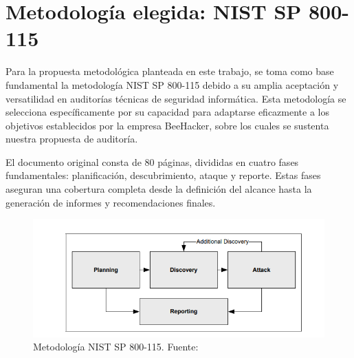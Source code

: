 \documentclass[a4paper, 11pt]{article}
\begin{document}
\par\vspace{0.5cm}




\clearpage







\section{Metodología elegida: NIST SP 800-115}

\par\vspace{0.5cm}

Para la propuesta metodológica planteada en este trabajo, se toma como base fundamental la metodología NIST SP 800-115 debido a su amplia aceptación y versatilidad en auditorías técnicas de seguridad informática. Esta metodología se selecciona específicamente por su capacidad para adaptarse eficazmente a los objetivos establecidos por la empresa BeeHacker, sobre los cuales se sustenta nuestra propuesta de auditoría. 
\par\vspace{0.5cm}


El documento original consta de 80 páginas, divididas en cuatro fases fundamentales: planificación, descubrimiento, ataque y reporte. Estas fases aseguran una cobertura completa desde la definición del alcance hasta la generación de informes y recomendaciones finales. \cite{nist800115} 


\begin{figure}[H]
    \centering
    \includegraphics[width=13cm]{images/nist_800115.png}
    \caption{Metodología NIST SP 800-115. Fuente: \cite{nist800115}}
    \label{fig:nist_800115}
\end{figure}
\end{document}
